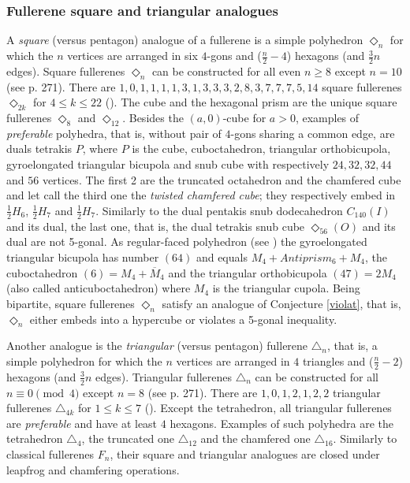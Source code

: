 \subsubsection{Fullerene square and triangular analogues}
A {\it square} (versus pentagon) analogue of a fullerene is a simple polyhedron
$\Diamond_n$ for which the $n$ vertices are arranged in six $4$-gons and ($\frac{n}{2}-4$)
hexagons (and $\frac{3}{2}n$ edges). Square fullerenes $\Diamond_n$ can be constructed
for all even $n\geq 8$ except $n=10$ (see \cite{grun} p. 271).
There are $1,0,1,1,1,1,3,1,3,3,3,2,8,3,7,7,7,5,14$ square fullerenes $\Diamond_{2k}$ for $4\leq k \leq 22$
(\cite{dill}).
The cube and the hexagonal prism are the unique square fullerenes
$\Diamond_8$ and $\Diamond_{12}$.
Besides the $(a,0)$-cube for $a>0$, examples of {\it preferable} polyhedra,
that is, without pair of $4$-gons sharing a common edge, are duals tetrakis $P$,
where $P$ is the
cube, cuboctahedron, triangular orthobicupola,
gyroelongated triangular bicupola and snub cube with respectively
$24,32,32,44$ and $56$ vertices. The first 2 are the
truncated octahedron and the chamfered cube
and let call the third one the {\em twisted chamfered cube}; they
respectively embed in $\frac{1}{2}H_{6}$, $\frac{1}{2}H_{7}$ and
$\frac{1}{2}H_{7}$. Similarly to the dual pentakis snub dodecahedron $C_{140}(I)$
and its dual, the last one, that is, the dual tetrakis snub cube
$\Diamond_{56}(O)$ and its dual are not 5-gonal.
As regular-faced polyhedron (see \cite{b71,Za})
the gyroelongated triangular bicupola has number $(64)$ and equals
$M_4+Antiprism_{6}+M_4$, the cuboctahedron $(6)=M_4+\overline{M}_4$ and
the triangular orthobicupola $(47)=2M_4$ (also called anticuboctahedron) where
$M_4$ is the triangular cupola.
Being bipartite, square fullerenes $\Diamond_n$ satisfy an analogue of Conjecture \ref{violat},
that is, $\Diamond_n$ either embeds into a hypercube or violates a 5-gonal inequality.

Another analogue is the {\it triangular} (versus pentagon) fullerene $\triangle_n$,
that is, a simple polyhedron
for which the  $n$ vertices are arranged in $4$ triangles and ($\frac{n}{2}-2$) hexagons
(and $\frac{3}{2}n$ edges).
Triangular fullerenes $\triangle_n$ can be constructed
for all $n\equiv 0\!\!\!\pmod{4}$ except $n=8$ (see \cite{grun} p. 271).
There are $1,0,1,2,1,2,2$ triangular fullerenes $\triangle_{4k}$ for $1\leq k \leq 7$ (\cite{dill}).  
Except the tetrahedron, all triangular fullerenes are
{\it preferable} and have at least $4$ hexagons.  Examples of such polyhedra are the
tetrahedron $\triangle_4$, the truncated one $\triangle_{12}$ and the
chamfered one $\triangle_{16}$. Similarly to classical fullerenes $F_n$,
their square and triangular analogues are closed under leapfrog and 
chamfering operations.

